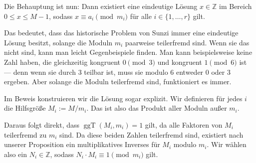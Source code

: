 \begin{spoken-clean}[01:03:41 - 01:08:53]
Die Behauptung ist nun: Dann existiert eine eindeutige Lösung $x \in \mathbb{Z}$ im Bereich $0 \le x \le M - 1$, sodass $x \equiv a_i \pmod{m_i}$ für alle $i \in \{1, \dots, r\}$ gilt.

Das bedeutet, dass das historische Problem von Sunzi immer eine eindeutige Lösung besitzt, solange die Moduln $m_i$ paarweise teilerfremd sind. Wenn sie das nicht sind, kann man leicht Gegenbeispiele finden. Man kann beispielsweise keine Zahl haben, die gleichzeitig kongruent $0 \pmod 3$ und kongruent $1 \pmod 6$ ist --- denn wenn sie durch $3$ teilbar ist, muss sie modulo $6$ entweder $0$ oder $3$ ergeben. Aber solange die Moduln teilerfremd sind, funktioniert es immer.

Im Beweis konstruieren wir die Lösung sogar explizit.  Wir definieren für jedes $i$ die Hilfsgröße $M_i := M / m_i$. Das ist also das Produkt aller Moduln außer $m_i$.

Daraus folgt direkt, dass $\operatorname{ggT}(M_i, m_i) = 1$ gilt, da alle Faktoren von $M_i$ teilerfremd zu $m_i$ sind. Da diese beiden Zahlen teilerfremd sind, existiert nach unserer Proposition ein multiplikatives Inverses für $M_i$ modulo $m_i$. Wir wählen also ein $N_i \in \mathbb{Z}$, sodass $N_i \cdot M_i \equiv 1 \pmod{m_i}$ gilt.
\end{spoken-clean}

